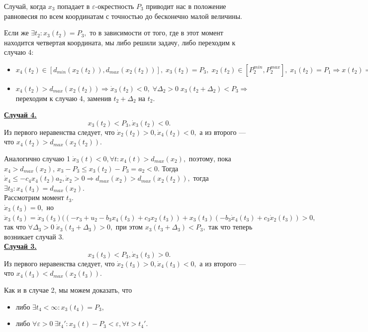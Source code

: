 \documentclass[11pt]{article}
\theoremstyle{definition}
\begin{document}
Случай, когда $x_3$ попадает в $\varepsilon$-окрестность $P_3$ приводит нас в положение равновесия по всем координатам с точностью до бесконечно малой величины.

Если же $\exists t_2 : x_3(t_2) = P_3,$ то в зависимости от того, где в этот момент находится четвертая координата, мы либо решили задачу, либо переходим к случаю 4:
\begin{itemize}
	\item $x_4(t_2) \in [d_{min}(x_2(t_2)), d_{max}(x_2(t_2))], \; x_3(t_2) = P_3, \; x_2(t_2) \in [P_2^{min}, P_2^{max}], \; x_1(t_2) = P_1 \Rightarrow x(t_2) = P(u).$
	\item $x_4(t_2) > d_{max}(x_2(t_2)) \Rightarrow \dot x_3(t_2) < 0, \; \forall \Delta_2 > 0 \; x_3(t_2 + \Delta_2) < P_3 \Rightarrow$ переходим к случаю 4, заменив $t_2 + \Delta_2$ на $t_2$.
\end{itemize}

\underline{\bf Случай 4.}
$$x_3(t_2) < P_3, \dot x_3(t_2) < 0.$$
Из первого неравенства следует, что $\dot x_2(t_2) > 0, \dot x_4(t_2) < 0,$ а из второго --- что $x_4(t_2) > d_{max}(x_2(t_2)).$

Аналогично случаю 1 $\dot x_3(t) < 0, \forall t : x_4(t) > d_{max}(x_2),$ поэтому, пока $x_4 > d_{max}(x_2)$, $ x_3 - P_3\leqslant x_3(t_2) - P_3 = a_2 < 0.$ Тогда $\dot x_4 \leqslant -c_4x_4(t_2)a_2, \dot x_2 > 0 \Rightarrow d_{max}(x_2) > d_{max}(x_2(t_2)),$ тогда $\exists t_3 : x_4(t_3) = d_{max}(x_2).$ \\
Рассмотрим момент $t_3.$ \\
$\dot x_3(t_3) = 0,$ но $\ddot x_3(t_3) = \dot x_3(t_3)((-r_3 + u_2 - b_3x_4(t_3) + c_3x_2(t_3)) + x_3(t_3)(-b_3\dot x_4(t_3) + c_3 \dot x_2(t_3)) > 0,$ так что $\forall \Delta_3 > 0 \; \dot x_3(t_3 + \Delta_3) > 0,$ при этом $x_3(t_3 + \Delta_3) < P_3,$ так что теперь возникает случай 3.\\

\underline{\bf Случай 3.}
$$x_3(t_3) < P_3, \dot x_3(t_3) > 0.$$
Из первого неравенства следует, что $\dot x_2(t_3) > 0, \dot x_4(t_3) < 0,$ а из второго --- что $x_4(t_3) < d_{max}(x_2(t_3)).$

Как и в случае 2, мы можем доказать, что 
\begin{itemize}
	\item либо $\exists t_4 < \infty:  x_3(t_4) = P_3,$
	\item либо $\forall \varepsilon > 0 \: \exists t_4' : x_3(t) - P_3 < \varepsilon, \forall t > t_4'.$
\end{itemize}
\end{document}
